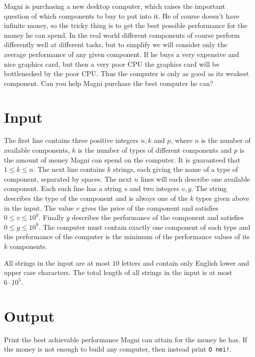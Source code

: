 
Magni is purchasing a new desktop computer, which raises the important question of which components to buy to put into it. He of course doesn't
have infinite money, so the tricky thing is to get the best possible performance for the money he can spend. In the real world different 
components of course perform differently well at different tasks, but to simplify we will consider only the average performance of any given
component. If he buys a very expensive and nice graphics card, but then a very poor CPU the graphics card will be bottlenecked by the poor
CPU. Thus the computer is only as good as its weakest component. Can you help Magni purchase the best computer he can?

\section*{Input}
The first line contains three positive integers $n, k$ and $p$, where $n$ is the number of available components, 
$k$ is the number of types of different components and $p$ is the amount of money Magni can spend on the computer. 
It is guaranteed that $1 \leq k \leq n$.
The next line contains $k$ strings, each
giving the name of a type of component, separated by spaces. The next $n$ lines will each describe one available component. Each such
line has a string $s$ and two integers $v, g$. The string describes the type of the component and is always one of the $k$ types given
above in the input. The value $v$ gives the price of the component and satisfies $0 \leq v \leq 10^9$. Finally $g$ describes the performance of
the component and satisfies $0 \leq g \leq 10^9$. The computer must contain exactly one component of each type and the performance of
the computer is the minimum of the performance values of its $k$ components.

All strings in the input are at most $10$ letters and contain only English lower and upper case characters. The total length of all
strings in the input is at most $6 \cdot 10^5$.

\section*{Output}
Print the best achievable performance Magni can attain for the money he has. If the money is not enough to build any computer, then instead
print \texttt{O nei!}.

